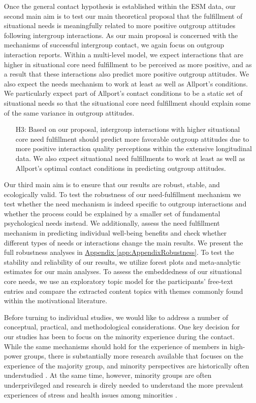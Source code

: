 \documentclass[man, 12pt, a4paper, mask]{apa7}
\theoremstyle{break}
\theoremstyle{plain}
\newcommand{\appref}[2][]{\hyperref[#2]{Appendix \ref*{#2}#1}}
\begin{document}
Once the general contact hypothesis is established within the ESM data, our second main aim is to test our main theoretical proposal that the fulfillment of situational needs is meaningfully related to more positive outgroup attitudes following intergroup interactions. As our main proposal is concerned with the mechanisms of successful intergroup contact, we again focus on outgroup interaction reports. Within a multi-level model, we expect interactions that are higher in situational core need fulfillment to be perceived as more positive, and as a result that these interactions also predict more positive outgroup attitudes. We also expect the needs mechanism to work at least as well as Allport's conditions. We particularly expect part of Allport's contact conditions to be a static set of situational needs so that the situational core need fulfillment should explain some of the same variance in outgroup attitudes.
\begin{enumerate}[leftmargin=1.5\parindent]
    \item[H3:] Based on our proposal, intergroup interactions with higher situational core need fulfillment should predict more favorable outgroup attitudes due to more positive interaction quality perceptions within the extensive longitudinal data. We also expect situational need fulfillments to work at least as well as Allport's optimal contact conditions in predicting outgroup attitudes.
\end{enumerate}

Our third main aim is to ensure that our results are robust, stable, and ecologically valid. To test the robustness of our need-fulfillment mechanism we test whether the need mechanism is indeed specific to outgroup interactions and whether the process could be explained by a smaller set of fundamental psychological needs instead. We additionally, assess the need fulfillment mechanism in predicting individual well-being benefits and check whether different types of needs or interactions change the main results. We present the full robustness analyses in \appref{app:AppendixRobustness}. To test the stability and reliability of our results, we utilize forest plots and meta-analytic estimates for our main analyses. To assess the embeddedness of our situational core needs, we use an exploratory topic model for the participants' free-text entries and compare the extracted content topics with themes commonly found within the motivational literature.

Before turning to individual studies, we would like to address a number of conceptual, practical, and methodological considerations. One key decision for our studies has been to focus on the minority experience during the contact. While the same mechanisms should hold for the experience of members in high-power groups, there is substantially more research available that focuses on the experience of the majority group, and minority perspectives are historically often understudied \citep[e.g.,][]{Dovidio2017}. At the same time, however, minority groups are often underprivileged and research is direly needed to understand the more prevalent experiences of stress and health issues among minorities \citep[e.g.,][]{alvidrez2019}. 
\end{document}
